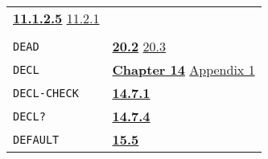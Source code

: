 \documentclass[a4paper,]{article}
\begin{document}
\begin{longtable}[]{@{}ll@{}}
\begin{minipage}[t]{0.70\columnwidth}
\textbf{\href{11-input-output.md\#11125-crlf}{11.1.2.5}} \href{11-input-output.md\#1121-open}{11.2.1}\strut
\end{minipage}\tabularnewline
\begin{minipage}[t]{0.24\columnwidth}\raggedright\strut
\strut
\end{minipage} & \begin{minipage}[t]{0.70\columnwidth}\raggedright\strut
\strut
\end{minipage}\tabularnewline
\begin{minipage}[t]{0.24\columnwidth}\raggedright\strut
\texttt{DEAD}\strut
\end{minipage} & \begin{minipage}[t]{0.70\columnwidth}\raggedright\strut
\textbf{\href{20-coroutines.md\#202-state-of-a-process}{20.2}} \href{20-coroutines.md\#203-process-the-subr}{20.3}\strut
\end{minipage}\tabularnewline
\begin{minipage}[t]{0.24\columnwidth}\raggedright\strut
\texttt{DECL}\strut
\end{minipage} & \begin{minipage}[t]{0.70\columnwidth}\raggedright\strut
\textbf{\href{14-data-type-declarations.md\#chapter-14-data-type-declarations}{Chapter 14}}
\href{appendix-1-a-look-inside.md\#variable-bindings}{Appendix 1}\strut
\end{minipage}\tabularnewline
\begin{minipage}[t]{0.24\columnwidth}\raggedright\strut
\texttt{DECL-CHECK}\strut
\end{minipage} & \begin{minipage}[t]{0.70\columnwidth}\raggedright\strut
\textbf{\href{14-data-type-declarations.md\#1471-decl-check}{14.7.1}}\strut
\end{minipage}\tabularnewline
\begin{minipage}[t]{0.24\columnwidth}\raggedright\strut
\texttt{DECL?}\strut
\end{minipage} & \begin{minipage}[t]{0.70\columnwidth}\raggedright\strut
\textbf{\href{14-data-type-declarations.md\#1474-decl}{14.7.4}}\strut
\end{minipage}\tabularnewline
\begin{minipage}[t]{0.24\columnwidth}\raggedright\strut
\texttt{DEFAULT}\strut
\end{minipage} & \begin{minipage}[t]{0.70\columnwidth}\raggedright\strut
\textbf{\href{15-lexical-blocking.md\#155-initial-state}{15.5}}\strut

\end{minipage}
\end{longtable}
\end{document}
